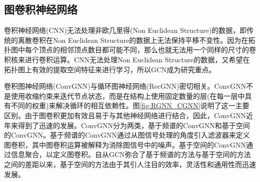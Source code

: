 \subsection{图卷积神经网络}
卷积神经网络(CNN)无法处理非欧几里得(Non Euclidean Structure)的数据，即传统的离散卷积在Non Euclidean Structure的数据上无法保持平移不变性。因为在拓扑图中每个顶点的相邻顶点数目都可能不同，那么也就无法用一个同样的尺寸的卷积核来进行卷积运算。CNN无法处理Non Euclidean Structure的数据，又希望在拓扑图上有效的提取空间特征来进行学习，所以GCN成为研究重点。

卷积图神经网络(ConvGNN)与循环图神经网络(RecGNN)密切相关。ConvGNN不是使用收缩约束来迭代节点状态，而是在结构上使用固定数量的层(在每一层中具有不同的权重)来解决循环的相互依赖性。图\ref{fig:RGNN_CGNN}说明了这一主要区别。由于图卷积更加有效且易于与其他神经网络进行结合，因此，ConvGNN近年来得到了迅速的发展。ConvGNN分为两类，基于频谱的ConvGNN和基于空间的ConvGNN。基于频谱的ConvGNN通过从图信号处理的角度引入滤波器来定义图卷积，其中图卷积运算被解释为消除图信号中的噪声。基于空间的ConvGNN通过信息聚合，以定义图卷积。自从GCN弥合了基于频谱的方法与基于空间的方法之间的差距以来，基于空间的方法由于其引人注目的效率，灵活性和通用性而迅速发展。

